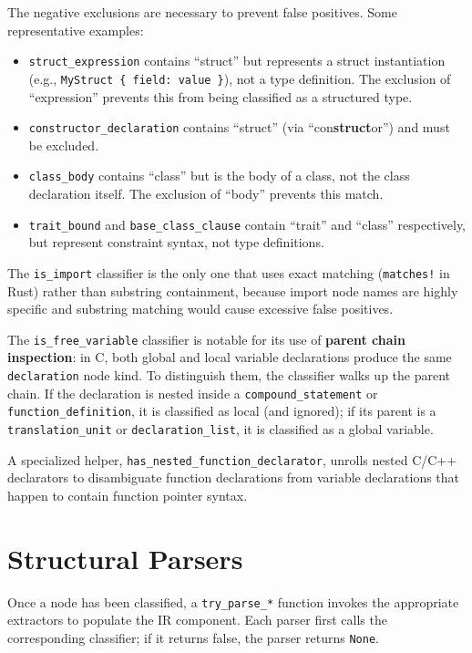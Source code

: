 The negative exclusions are necessary to prevent false positives.
Some representative examples:
\begin{itemize}
  \item \texttt{struct\_expression} contains ``struct'' but
    represents a struct instantiation (e.g., \texttt{MyStruct \{
    field: value \}}), not a type definition. The exclusion of
    ``expression'' prevents this from being classified as a structured type.
  \item \texttt{constructor\_declaration} contains ``struct'' (via
    ``con\textbf{struct}or'') and must be excluded.
  \item \texttt{class\_body} contains ``class'' but is the body of a
    class, not the class declaration itself. The exclusion of
    ``body'' prevents this match.
  \item \texttt{trait\_bound} and \texttt{base\_class\_clause}
    contain ``trait'' and ``class'' respectively, but represent
    constraint syntax, not type definitions.
\end{itemize}

The \texttt{is\_import} classifier is the only one that uses exact
matching (\texttt{matches!} in Rust) rather than substring
containment, because import node names are highly specific and
substring matching would cause excessive false positives.

The \texttt{is\_free\_variable} classifier is notable for its use of
\textbf{parent chain inspection}: in C, both global and local
variable declarations produce the same \texttt{declaration} node
kind. To distinguish them, the classifier walks up the parent chain.
If the declaration is nested inside a \texttt{compound\_statement} or
\texttt{function\_definition}, it is classified as local (and
ignored); if its parent is a \texttt{translation\_unit} or
\texttt{declaration\_list}, it is classified as a global variable.

A specialized helper, \texttt{has\_nested\_function\_declarator},
unrolls nested C/C++ declarators to disambiguate function
declarations from variable declarations that happen to contain
function pointer syntax.

\section{Structural Parsers}
\label{sec:parsers}

Once a node has been classified, a \texttt{try\_parse\_*} function
invokes the appropriate extractors to populate the IR component. Each
parser first calls the corresponding classifier; if it returns false,
the parser returns \texttt{None}.

